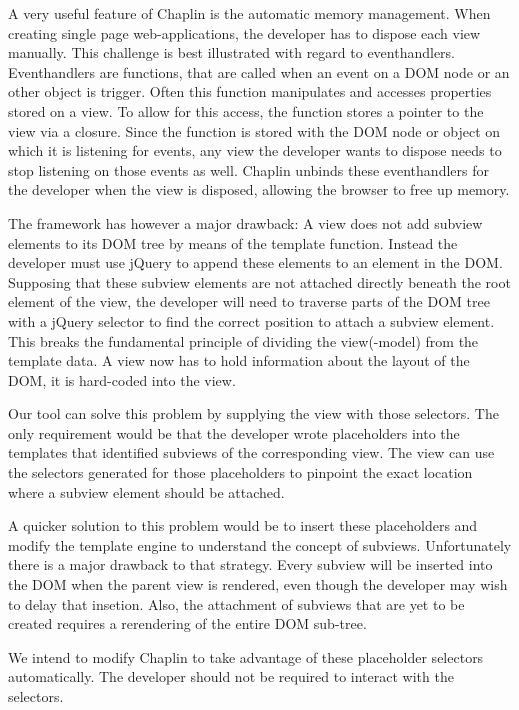 A very useful feature of Chaplin is the automatic memory management.
When creating single page web-applications, the developer has to dispose each
view manually. This challenge is best illustrated with regard to eventhandlers.
Eventhandlers are functions, that are called when an event on a DOM node or
an other object is trigger. Often this function manipulates and accesses
properties stored on a view. To allow for this access, the function stores a
pointer to the view via a closure. Since the function is stored with the
DOM node or object on which it is listening for events, any view the developer
wants to dispose needs to stop listening on those events as well.
Chaplin unbinds these eventhandlers for the developer when the view is disposed,
allowing the browser to free up memory.

The framework has however a major drawback: A view does not add subview elements
to its DOM tree by means of the template function. Instead the developer
must use jQuery to append these elements to an element in the DOM.
Supposing that these subview elements are not attached directly beneath the root
element of the view, the developer will need to traverse parts of the DOM tree
with a jQuery selector to find the correct position to attach a subview element.
This breaks the fundamental principle of dividing the view(-model) from the
template data. A view now has to hold information about the layout of the DOM,
it is hard-coded into the view.

Our tool can solve this problem by supplying the view with those selectors.
The only requirement would be that the developer wrote placeholders into the
templates that identified subviews of the corresponding view.
The view can use the selectors generated for those placeholders
to pinpoint the exact location where a subview element should be attached.

A quicker solution to this problem would be to insert these placeholders and
modify the template engine to understand the concept of subviews.
Unfortunately there is a major drawback to that strategy.
Every subview will be inserted into the DOM when the parent view is rendered,
even though the developer may wish to delay that insetion.
Also, the attachment of subviews that are yet to be created requires a
rerendering of the entire DOM sub-tree.

We intend to modify Chaplin to take advantage of these placeholder selectors
automatically. The developer should not be required to interact with the
selectors.

